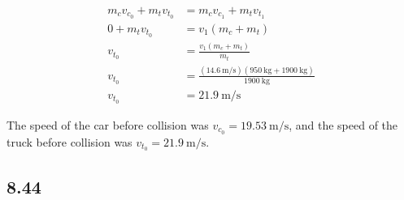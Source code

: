 \documentclass{article}
\begin{document}
\begin{align*}
	m_cv_{c_0} + m_tv_{t_0} & = m_cv_{c_1} + m_tv_{t_1} \\
	0 + m_tv_{t_0} & = v_1(m_c + m_t) \\
	v_{t_0} & = \frac{ v_1(m_c + m_t) }{ m_t } \\
	v_{t_0} & = \frac{ (\SI{14.6}{\meter \per \second})(\SI{950}{\kilogram} + \SI{1900}{\kilogram}) }{ \SI{1900}{\kilogram} } \\
	v_{t_0} & = \SI{21.9}{\meter \per \second}
\end{align*}
\begin{mdframed}
	The speed of the car before collision was $ v_{c_0} = \SI{19.53}{\meter \per \second} $, and the speed of the truck before collision was $ v_{t_0} = \SI{21.9}{\meter \per \second} $.
\end{mdframed}

\subsection{8.44}
\end{document}

